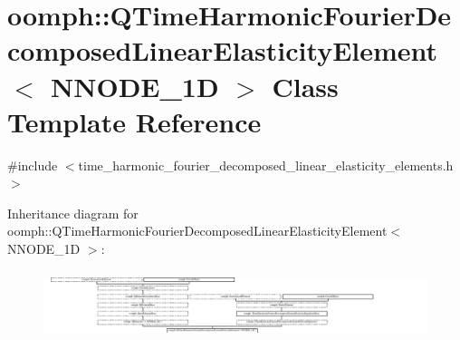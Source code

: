 \hypertarget{classoomph_1_1QTimeHarmonicFourierDecomposedLinearElasticityElement}{}\section{oomph\+:\+:Q\+Time\+Harmonic\+Fourier\+Decomposed\+Linear\+Elasticity\+Element$<$ N\+N\+O\+D\+E\+\_\+1D $>$ Class Template Reference}
\label{classoomph_1_1QTimeHarmonicFourierDecomposedLinearElasticityElement}


{\ttfamily \#include $<$time\+\_\+harmonic\+\_\+fourier\+\_\+decomposed\+\_\+linear\+\_\+elasticity\+\_\+elements.\+h$>$}

Inheritance diagram for oomph\+:\+:Q\+Time\+Harmonic\+Fourier\+Decomposed\+Linear\+Elasticity\+Element$<$ N\+N\+O\+D\+E\+\_\+1D $>$\+:\begin{figure}[H]
\begin{center}
\leavevmode
\includegraphics[height=2.000000cm]{classoomph_1_1QTimeHarmonicFourierDecomposedLinearElasticityElement}
\end{center}
\end{figure}
